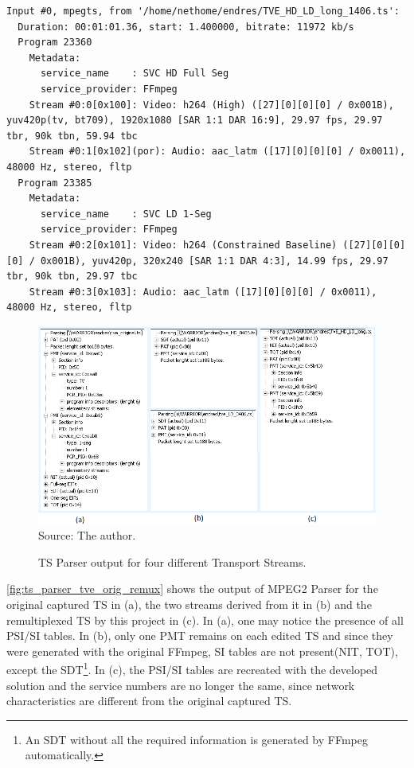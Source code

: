 \documentclass[12pt,a4paper]{article}
\begin{document}
\begin{minipage}{\linewidth}
\begin{lstlisting}[caption={FFprobe analysing the multi-service TS.}, label={lst_ffprobe_multi_service}]
Input #0, mpegts, from '/home/nethome/endres/TVE_HD_LD_long_1406.ts':
  Duration: 00:01:01.36, start: 1.400000, bitrate: 11972 kb/s
  Program 23360 
    Metadata:
      service_name    : SVC HD Full Seg
      service_provider: FFmpeg
    Stream #0:0[0x100]: Video: h264 (High) ([27][0][0][0] / 0x001B), yuv420p(tv, bt709), 1920x1080 [SAR 1:1 DAR 16:9], 29.97 fps, 29.97 tbr, 90k tbn, 59.94 tbc
    Stream #0:1[0x102](por): Audio: aac_latm ([17][0][0][0] / 0x0011), 48000 Hz, stereo, fltp
  Program 23385 
    Metadata:
      service_name    : SVC LD 1-Seg
      service_provider: FFmpeg
    Stream #0:2[0x101]: Video: h264 (Constrained Baseline) ([27][0][0][0] / 0x001B), yuv420p, 320x240 [SAR 1:1 DAR 4:3], 14.99 fps, 29.97 tbr, 90k tbn, 29.97 tbc
    Stream #0:3[0x103]: Audio: aac_latm ([17][0][0][0] / 0x0011), 48000 Hz, stereo, fltp
\end{lstlisting}
\end{minipage}

\begin{figure}[!h]
\centering
\caption{TS Parser output for four different Transport Streams.}
\includegraphics[width=0.9\linewidth]{pictures/ts_parser_tve_orig_remux.png}
\\Source: The author.
\label{fig:ts_parser_tve_orig_remux}
\end{figure}

\autoref{fig:ts_parser_tve_orig_remux} shows the output of MPEG2 Parser for the original captured TS in (a), the two streams derived from it in (b) and the remultiplexed TS by this project in (c). In (a), one may notice the presence of all PSI/SI tables. In (b), only one PMT remains on each edited TS and since they were generated with the original FFmpeg, SI tables are not present(NIT, TOT), except the SDT\footnote{An SDT without all the required information is generated by FFmpeg automatically.}. In (c), the PSI/SI tables are recreated with the developed solution and the service numbers are no longer the same, since network characteristics are different from the original captured TS.
\end{document}

